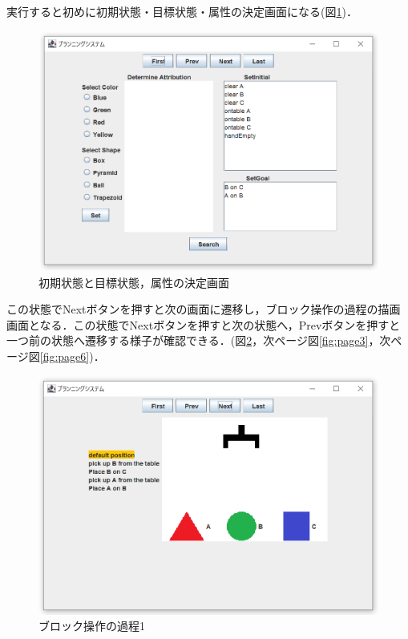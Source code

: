 \documentclass[12pt]{jarticle}
\begin{document}
実行すると初めに初期状態・目標状態・属性の決定画面になる(図\ref{fig:page1})．
\begin{figure}[htbp]
  \begin{center}
    \includegraphics[scale=0.6]{images/page1.PNG}
    \caption{初期状態と目標状態，属性の決定画面}
    \label{fig:page1}
  \end{center}
\end{figure}
\clearpage
この状態でNextボタンを押すと次の画面に遷移し，ブロック操作の過程の描画画面となる．この状態でNextボタンを押すと次の状態へ，Prevボタンを押すと一つ前の状態へ遷移する様子が確認できる．(図\ref{fig:page2}，次ページ図\ref{fig:page3}，次ページ図\ref{fig:page6})．
\begin{figure}[htbp]
  \begin{center}
    \includegraphics[scale=0.6]{images/page2.PNG}
    \caption{ブロック操作の過程1}
    \label{fig:page2}
  \end{center}
\end{figure}
\end{document}
